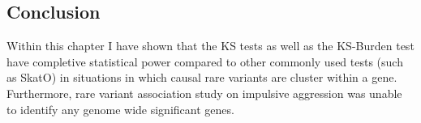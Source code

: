 \subsection{Conclusion}
\label{sub:conclusion_ks}
Within this chapter I have shown that the KS tests as well as the KS-Burden test have completive statistical power compared to other commonly used tests (such as SkatO) in situations in which causal rare variants are cluster within a gene. 
Furthermore, rare variant association study on impulsive aggression was unable to identify any genome wide significant genes.

